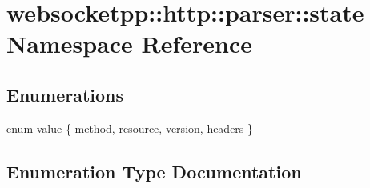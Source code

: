 \hypertarget{namespacewebsocketpp_1_1http_1_1parser_1_1state}{}\section{websocketpp\+:\+:http\+:\+:parser\+:\+:state Namespace Reference}
\label{namespacewebsocketpp_1_1http_1_1parser_1_1state}
\subsection*{Enumerations}
\begin{DoxyCompactItemize}
\item 
enum \hyperlink{namespacewebsocketpp_1_1http_1_1parser_1_1state_a12f378e0c6dbf373781e7988ee4a0853}{value} \{ \hyperlink{namespacewebsocketpp_1_1http_1_1parser_1_1state_a12f378e0c6dbf373781e7988ee4a0853a808f25179e5ccace33050c0f65571dee}{method}, 
\hyperlink{namespacewebsocketpp_1_1http_1_1parser_1_1state_a12f378e0c6dbf373781e7988ee4a0853a2d924502c35c713b76e006eed381b5f9}{resource}, 
\hyperlink{namespacewebsocketpp_1_1http_1_1parser_1_1state_a12f378e0c6dbf373781e7988ee4a0853a08c88a938bc459c7997b48f74248752f}{version}, 
\hyperlink{namespacewebsocketpp_1_1http_1_1parser_1_1state_a12f378e0c6dbf373781e7988ee4a0853aedc0802bf79725cb1bface3aabff7296}{headers}
 \}
\end{DoxyCompactItemize}


\subsection{Enumeration Type Documentation}
\hypertarget{namespacewebsocketpp_1_1http_1_1parser_1_1state_a12f378e0c6dbf373781e7988ee4a0853}{}
